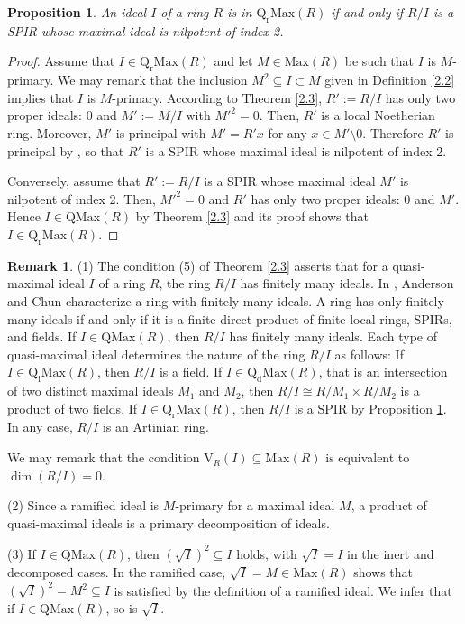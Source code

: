 \documentclass[12pt,leqno]{amsart}
\newtheorem{proposition}[theorem]{Proposition}
\theoremstyle{definition}
\newtheorem{remark}[theorem]{Remark}
\begin{document}
\begin{proposition}\label{2.5} An ideal $I$ of a ring $R$ is in $\mathrm {Q_rMax}(R)$ if and only if $R/I$ is a SPIR whose maximal ideal is nilpotent of index 2.
\end{proposition}
\begin{proof} Assume that $I\in\mathrm{Q_rMax}( R)$ and let $M\in\mathrm{Max}(R)$ be such that $I$ is $M$-primary. We may remark that the inclusion $M^2\subseteq I\subset M$ given in Definition \ref{2.2} implies that $I$ is $M$-primary. According to Theorem \ref{2.3}, $ R':=R/I$ has only two proper ideals: $0$ and $M':=M/I$ with $M'^2=0$. Then, $R'$ is a local Noetherian ring. Moreover, $M'$ is principal with $M'= R'x$ for any $x\in M'\setminus 0$. Therefore $R'$ is principal by \cite[Proposition 4]{Hun}, so that $R'$ is a SPIR whose maximal ideal is  nilpotent of index 2.

Conversely, assume that $R':=R/I$ is a SPIR whose maximal ideal $M'$ is  nilpotent of index 2. Then, $M'^2=0$ and $R'$ has only two proper ideals: $0$ and $M'$. Hence $I\in\mathrm{QMax}(R)$ by Theorem \ref{2.3} and its proof shows that $I\in\mathrm{Q_rMax}( R)$. 
\end{proof}

\begin{remark}\label{2.4} (1) The condition (5) of Theorem \ref{2.3} asserts that for a quasi-maximal ideal $I$ of a ring $R$, the ring $R/I$ has finitely many ideals. In \cite[Corollary 2.4]{AC}, Anderson and Chun characterize a ring with finitely many ideals. A ring has only finitely many ideals if and only if it is a finite direct product of finite local rings, SPIRs, and fields. If $I\in\mathrm{QMax}(R)$, then $R/I$ has finitely many ideals. Each type of quasi-maximal ideal determines the nature of the ring $R/I$ as follows: If $I \in\mathrm{Q_iMax}(R)$, then $R/I$ is a field. If $I\in\mathrm{Q_dMax}(R)$, that is an intersection of two distinct maximal ideals $M_1$ and $M_2$, then $R/I\cong R/M_1\times R/M_2$ is a product of two fields. If $I\in\mathrm{Q_rMax}(R)$, then $R/I$ is a SPIR by Proposition \ref{2.5}. In any case, $R/I$ is an Artinian ring.
 
We may remark that the condition $\mathrm{V}_R(I)\subseteq  \mathrm{Max}(R)$ is equivalent to $\dim (R/I)=0$.
 
(2) Since a ramified ideal is $M$-primary for a maximal ideal $M$, a product of quasi-maximal ideals is a primary decomposition of ideals.

(3) If $I\in\mathrm{QMax}(R)$, then $(\sqrt I)^2\subseteq I$ holds, with $\sqrt I=I$ in the inert and decomposed cases. In the ramified case, $\sqrt I=M\in\mathrm{Max}(R)$ shows that $(\sqrt I)^2= M^2\subseteq I$ is satisfied by the definition of a ramified ideal. We infer that if $I\in\mathrm{QMax}(R)$,  so is $\sqrt I$. 
\end{remark}
\end{document}
